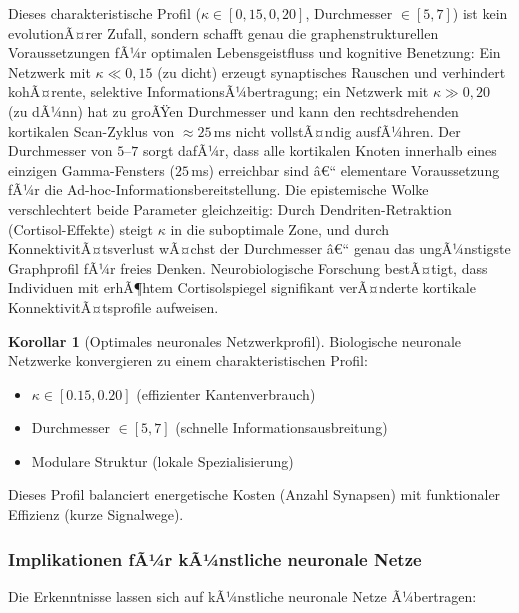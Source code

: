﻿\documentclass[a4paper,12pt]{article}
\theoremstyle{definition}
\newtheorem{korollar}{Korollar}
\begin{document}
	Dieses charakteristische Profil ($\kappa \in [0{,}15, 0{,}20]$, Durchmesser $\in [5, 7]$) ist kein evolutionÃ¤rer Zufall, sondern schafft genau die graphenstrukturellen Voraussetzungen fÃ¼r optimalen Lebensgeistfluss und kognitive Benetzung: Ein Netzwerk mit $\kappa \ll 0{,}15$ (zu dicht) erzeugt synaptisches Rauschen und verhindert kohÃ¤rente, selektive InformationsÃ¼bertragung; ein Netzwerk mit $\kappa \gg 0{,}20$ (zu dÃ¼nn) hat zu groÃŸen Durchmesser und kann den rechtsdrehenden kortikalen Scan-Zyklus von $\approx 25$\,ms nicht vollstÃ¤ndig ausfÃ¼hren. Der Durchmesser von $5$--$7$ sorgt dafÃ¼r, dass alle kortikalen Knoten innerhalb eines einzigen Gamma-Fensters ($25$\,ms) erreichbar sind â€“ elementare Voraussetzung fÃ¼r die Ad-hoc-Informationsbereitstellung. Die epistemische Wolke verschlechtert beide Parameter gleichzeitig: Durch Dendriten-Retraktion (Cortisol-Effekte) steigt $\kappa$ in die suboptimale Zone, und durch KonnektivitÃ¤tsverlust wÃ¤chst der Durchmesser â€“ genau das ungÃ¼nstigste Graphprofil fÃ¼r freies Denken. Neurobiologische Forschung bestÃ¤tigt, dass Individuen mit erhÃ¶htem Cortisolspiegel signifikant verÃ¤nderte kortikale KonnektivitÃ¤tsprofile aufweisen.

	\begin{korollar}[Optimales neuronales Netzwerkprofil]
		Biologische neuronale Netzwerke konvergieren zu einem charakteristischen Profil:
		\begin{itemize}
			\item[-] $\kappa \in [0.15, 0.20]$ (effizienter Kantenverbrauch)
			\item[-] Durchmesser $\in [5, 7]$ (schnelle Informationsausbreitung)
			\item[-] Modulare Struktur (lokale Spezialisierung)
		\end{itemize}
		Dieses Profil balanciert energetische Kosten (Anzahl Synapsen) mit funktionaler Effizienz (kurze Signalwege).
	\end{korollar}
	
	\subsubsection{Implikationen fÃ¼r kÃ¼nstliche neuronale Netze}
	
	Die Erkenntnisse lassen sich auf kÃ¼nstliche neuronale Netze Ã¼bertragen:
	
\end{document}
